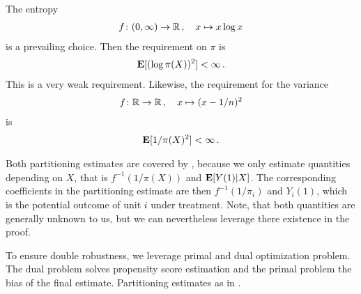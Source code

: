 \begin{remark}
  The entropy 
  \begin{gather*}
    f \colon (0, \infty)
    \to 
    \mathbb{R}
    \,,
    \quad
    x \mapsto x\log x
  \end{gather*}
  is a prevailing choice.
  Then the requirement on $\pi$ is
  \begin{gather*}
    \mathbf{E}
    [
    (
    \log \pi(X)
    )
    ^2
    ]
    <
    \infty
    \,.
  \end{gather*}
  This is a very weak requirement.
  Likewise, the requirement for the variance
  \begin{gather*}
    f \colon 
    \mathbb{R}
    \to 
    \mathbb{R}
    \,,
    \quad
    x \mapsto (x-1/n)^2
  \end{gather*}
  is
  \begin{gather*}
    \mathbf{E}
    [
    1/
    \pi(X)
    ^2
    ]
    <
    \infty
    \,.
  \end{gather*}
\end{remark}

\begin{remark}
  Both partitioning estimates are covered by \cite[§4]{Gyorfi2002},
  because we only estimate quantities depending on $X$,
  that is 
  $
  f^{-1}(1/\pi(X))
  $
  and 
  $
  \mathbf{E}[Y(1)|X]
  $.
  The corresponding coefficients in the partitioning estimate are then
  $
  f^{-1}(1/\pi_i)
  $
  and
  $
  Y_i(1)
  $,
  which is the potential outcome of unit $i$ under treatment.
  Note, that both quantities are generally unknown to us, but we can 
  nevertheless leverage there existence in the proof.
\end{remark}
\begin{takeaways}
  To ensure double robustness, we leverage primal and dual optimization
  problem. The dual problem solves propensity score estimation and the 
  primal problem the bias of the final estimate.
  Partitioning estimates as in \cite{Gyorfi2002}. 
\end{takeaways}


